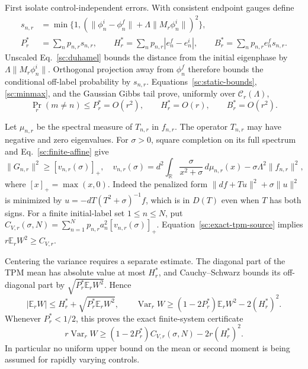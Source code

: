 \documentclass[aps,prl,reprint,superscriptaddress,longbibliography]{revtex4-2}
\begin{document}
First isolate control-independent errors. With consistent endpoint
gauges define
\begin{align}
 s_{n,r}&=\min\{1,(\|\phi_n^i-\phi_n^f\|
                     +\Lambda\|M_r\phi_n^i\|)^2\},\\
 P_r^*&=\sum_np_{n,r}s_{n,r},\qquad
 H_r^*=\sum_np_{n,r}|e_n^f-e_n^i|,\qquad
 B_r^*=\sum_np_{n,r}e_n^f s_{n,r}.
 \label{sc:static-errors}
\end{align}
Unscaled Eq.~\eqref{sc:duhamel} bounds the distance from the initial
eigenphase by $\Lambda\|M_r\phi_n^i\|$. Orthogonal projection away from
$\phi_n^f$ therefore bounds the conditional off-label probability by
$s_{n,r}$. Equations~\eqref{sc:static-bounds}, \eqref{sc:minmax}, and the
Gaussian Gibbs tail prove, uniformly over $\mathcal C_r(\Lambda)$,
\begin{equation}
 \Pr_r(m\ne n)\le P_r^*=O(r^2),\qquad
 H_r^*=O(r),\qquad B_r^*=O(r^2).
 \label{sc:error-orders}
\end{equation}

Let $\mu_{n,r}$ be the spectral measure of $T_{n,r}$ in $f_{n,r}$.
The operator $T_{n,r}$ may have negative and zero eigenvalues. For
$\sigma>0$, square completion on its full spectrum and
Eq.~\eqref{sc:finite-affine} give
\begin{equation}
 \|G_{n,r}\|^2\ge[v_{n,r}(\sigma)]_+,
 \quad
 v_{n,r}(\sigma)=d^2\int_{\mathbb R}
       \frac{\sigma}{x^2+\sigma}\,d\mu_{n,r}(x)
       -\sigma\Lambda^2\|f_{n,r}\|^2,
 \label{sc:finite-variance-bracket}
\end{equation}
where $[x]_+=\max(x,0)$. Indeed the penalized form
$\|df+Tu\|^2+\sigma\|u\|^2$ is minimized by
$u=-dT(T^2+\sigma)^{-1}f$, which is in $D(T)$ even when $T$ has both
signs. For a finite initial-label set $1\le n\le N$, put
$C_{V,r}(\sigma,N)=\sum_{n=1}^Np_{n,r}a_n^2[v_{n,r}(\sigma)]_+$.
Equation~\eqref{sc:exact-tpm-source} implies
$r\mathbb E_rW^2\ge C_{V,r}$.

Centering the variance requires a separate estimate. The diagonal part
of the TPM mean has absolute value at most $H_r^*$, and
Cauchy--Schwarz bounds its off-diagonal part by
$\sqrt{P_r^*\mathbb E_rW^2}$. Hence
\begin{equation}
 |\mathbb E_rW|\le H_r^*+\sqrt{P_r^*\mathbb E_rW^2},\qquad
 \operatorname{Var}_rW\ge(1-2P_r^*)\mathbb E_rW^2-2(H_r^*)^2.
 \label{sc:centering}
\end{equation}
Whenever $P_r^*<1/2$, this proves the exact finite-system certificate
\begin{equation}
 r\operatorname{Var}_rW\ge
 (1-2P_r^*)C_{V,r}(\sigma,N)-2r(H_r^*)^2.
 \label{sc:variance-certificate}
\end{equation}
In particular no uniform upper bound on the mean or second moment is
being assumed for rapidly varying controls.
\end{document}
